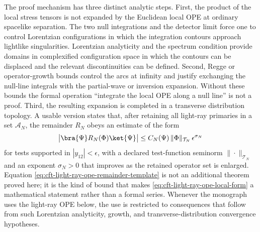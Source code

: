 The proof mechanism has three distinct analytic steps.  First, the product of
the local stress tensors is not expanded by the Euclidean local OPE at
ordinary spacelike separation.  The two null integrations and the detector
limit force one to control Lorentzian configurations in which the integration
contours approach lightlike singularities.  Lorentzian analyticity and the
spectrum condition provide domains in complexified configuration space in
which the contours can be displaced and the relevant discontinuities can be
defined.  Second, Regge or operator-growth bounds control the arcs at
infinity and justify exchanging the null-line integrals with the partial-wave
or inversion expansion.  Without these bounds the formal operation
``integrate the local OPE along a null line'' is not a proof.  Third, the
resulting expansion is completed in a transverse distribution topology.  A
usable version states that, after retaining all light-ray primaries in a set
\(\mathcal A_N\), the remainder \(R_N\) obeys an estimate of the form
\begin{equation}
  \bigl|
  \bra{\Psi}R_N(\Phi)\ket{\Psi}
  \bigr|
  \leq
  C_N(\Psi)\,
  \|\Phi\|_{\mathcal T_N}\,
  \epsilon^{\sigma_N}
  \label{eq:cft-light-ray-ope-remainder-template}
\end{equation}
for tests supported in \(|y_{12}|<\epsilon\), with a declared test-function
seminorm \(\|\cdot\|_{\mathcal T_N}\) and an exponent \(\sigma_N>0\) that
improves as the retained operator set is enlarged.  Equation
\eqref{eq:cft-light-ray-ope-remainder-template} is not an additional theorem
proved here; it is the kind of bound that makes
\eqref{eq:cft-light-ray-ope-local-form} a mathematical statement rather than
a formal series.  Whenever the monograph uses the light-ray OPE below, the
use is restricted to consequences that follow from such Lorentzian
analyticity, growth, and transverse-distribution convergence hypotheses.

